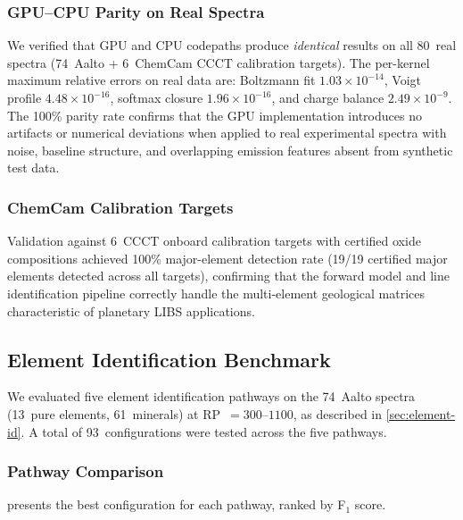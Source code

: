 \subsubsection{GPU--CPU Parity on Real Spectra}

We verified that GPU and CPU codepaths produce \emph{identical} results on all 80~real spectra (74~Aalto + 6~ChemCam CCCT calibration targets).
The per-kernel maximum relative errors on real data are: Boltzmann fit $1.03 \times 10^{-14}$, Voigt profile $4.48 \times 10^{-16}$, softmax closure $1.96 \times 10^{-16}$, and charge balance $2.49 \times 10^{-9}$.
The 100\% parity rate confirms that the GPU implementation introduces no artifacts or numerical deviations when applied to real experimental spectra with noise, baseline structure, and overlapping emission features absent from synthetic test data.

\subsubsection{ChemCam Calibration Targets}

Validation against 6~CCCT onboard calibration targets with certified oxide compositions \citep{Fabre2011} achieved 100\% major-element detection rate (19/19 certified major elements detected across all targets), confirming that the forward model and line identification pipeline correctly handle the multi-element geological matrices characteristic of planetary LIBS applications.

\subsection{Element Identification Benchmark}
\label{sec:results-element-id}

We evaluated five element identification pathways on the 74~Aalto spectra (13~pure elements, 61~minerals) at RP~$= 300$--$1100$, as described in \cref{sec:element-id}.
A total of 93~configurations were tested across the five pathways.

\subsubsection{Pathway Comparison}

 presents the best configuration for each pathway, ranked by F$_1$ score.

